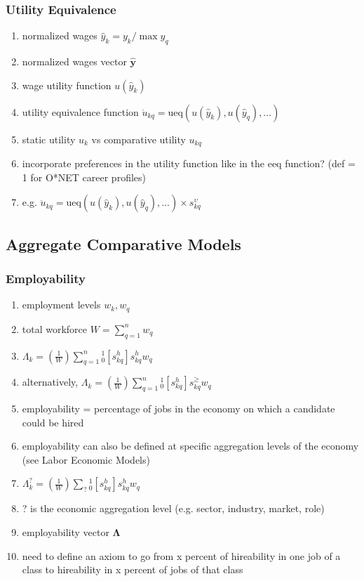 \documentclass{elsarticle} %
\begin{document}
\subsubsection{Utility Equivalence}
\begin{enumerate}
    \item normalized wages $\hat{y}_k = y_k / \max y_q$
    \item normalized wages vector $\boldsymbol{\hat{y}}$
    \item wage utility function $u(\hat{y}_k)$
    \item utility equivalence function $\ddot{u}_{kq} = \text{ueq}(u(\hat{y}_k),
              u(\hat{y}_q), ...)$
    \item static utility $u_k$ vs comparative utility $u_{kq}$
    \item incorporate preferences in the utility function like in the eeq function? (def
          = 1 for O*NET career profiles)
    \item e.g. $\ddot{u}_{kq} = \text{ueq}(u(\hat{y}_k), u(\hat{y}_q), ...) \times
              s_{kq}^{\upsilon}$
\end{enumerate}

\subsection{Aggregate Comparative Models}
\subsubsection{Employability}
\begin{enumerate}
    \item employment levels $w_k, w_q$
    \item total workforce $W = \sum_{q=1}^{n}{w_q}$
    \item $\Lambda_k = \left(\frac{1}{W}\right) \sum_{q=1}^{n}{_{0}^{1}[s_{kq}^{h}] s_{kq}^{h} w_q}$
    \item alternatively, $\Lambda_k = \left(\frac{1}{W}\right)
              \sum_{q=1}^{n}{_{0}^{1}[s_{kq}^{h}] s_{kq}^{\geq} w_q}$
    \item employability = percentage of jobs in the economy on which a candidate could be
          hired
    \item employability can also be defined at specific aggregation levels of the economy
          (see Labor Economic Models)
    \item $\Lambda_{k}^{?} = \left(\frac{1}{W}\right) \sum_{?}{_{0}^{1}[s_{kq}^{h}] s_{kq}^{h} w_q}$
    \item ? is the economic aggregation level (e.g. sector, industry, market, role)
    \item employability vector $\boldsymbol{\Lambda}$
    \item need to define an axiom to go from x percent of hireability in one job of a
          class to hireability in x percent of jobs of that class
\end{enumerate}
\end{document}
